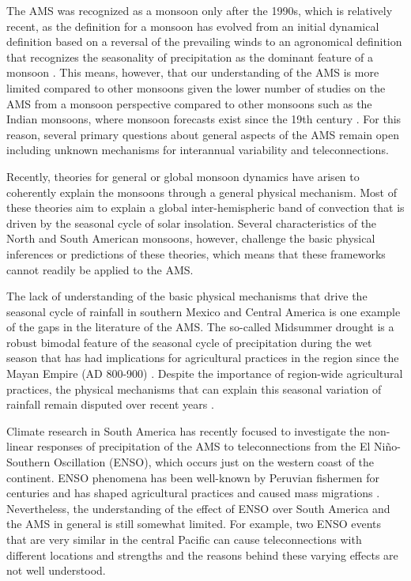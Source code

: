 The AMS was recognized as a monsoon only after the 1990s, which is relatively recent, as the definition for a monsoon has evolved from an initial dynamical definition based on a reversal of the prevailing winds to an agronomical definition that recognizes the seasonality of precipitation as the dominant feature of a monsoon \citep{wang2017,gadgil2018}. This  means, however, that our understanding of the AMS is more limited compared to other monsoons given the lower number of studies on the AMS from a monsoon perspective compared to other monsoons such as the Indian monsoons, where monsoon forecasts exist since the 19th century \citep{blanford}.
For this reason, several primary questions about general aspects of the AMS remain open including unknown mechanisms for interannual variability and teleconnections.

Recently, theories for general or global monsoon dynamics \citep{bordoni2008monsoons,biasutti2018global,hill2019,geen2020} have arisen to coherently explain the monsoons through a general physical mechanism. Most of these theories aim to explain a global inter-hemispheric band of convection that is driven by the seasonal cycle of solar insolation. Several characteristics of the North and South American monsoons, however, challenge the basic physical inferences or predictions of these theories, which means that these frameworks cannot readily  be applied to the AMS.%


The lack of understanding of the basic physical mechanisms that drive the seasonal cycle of rainfall in southern Mexico and Central America is one example of the gaps in the literature of the AMS. The so-called Midsummer drought is a robust bimodal feature of the seasonal cycle of precipitation during the wet season that has had implications for agricultural practices in the region since the Mayan Empire (AD 800-900) \citep{jobbova2018ritual}. Despite the importance of region-wide agricultural practices, the physical mechanisms that can explain this seasonal variation of rainfall remain disputed over recent years \citep{karnauskas2013,herrera2015,zermeno2019}. 

Climate research in South America has recently focused to investigate the non-linear responses of precipitation of the AMS to teleconnections from the El Niño-Southern Oscillation (ENSO), which occurs just on the western coast of the continent. ENSO phenomena has been well-known by Peruvian fishermen for centuries and has shaped agricultural practices and caused mass migrations \citep{caramanica2020nino}. Nevertheless, the understanding of the effect of ENSO over South America and the AMS in general is still somewhat limited. For example, two ENSO events that are very similar in the central Pacific can cause teleconnections with different locations and strengths and the reasons behind these varying effects are not well understood. 

